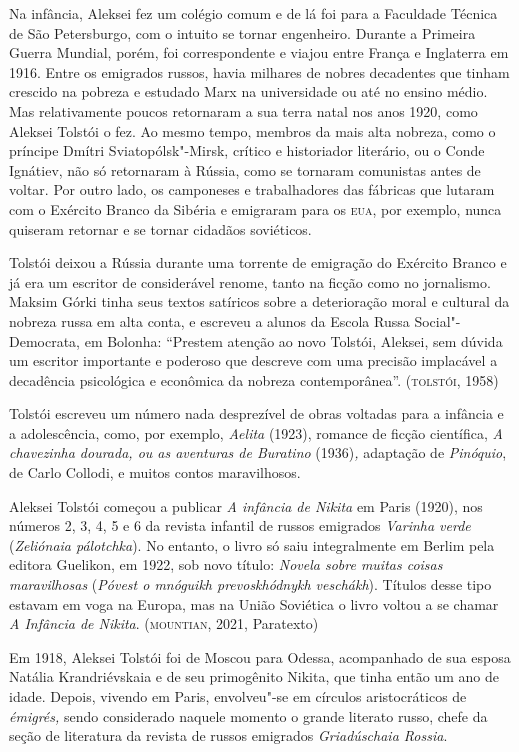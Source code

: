 \documentclass{article}
\begin{document}
Na infância, Aleksei fez um
colégio comum e de lá foi para a Faculdade Técnica de São Petersburgo,
com o intuito se tornar engenheiro. Durante a Primeira Guerra Mundial,
porém, foi correspondente e viajou entre França e Inglaterra em
1916. Entre os emigrados russos,
havia milhares de nobres decadentes que tinham crescido na pobreza e
estudado Marx na universidade ou até no ensino médio. Mas relativamente
poucos retornaram a sua terra natal nos anos 1920, como Aleksei Tolstói
o fez. Ao mesmo tempo, membros da mais alta nobreza, como o príncipe
Dmítri Sviatopólsk"-Mirsk, crítico e historiador literário, ou o Conde
Ignátiev, não só retornaram à Rússia, como se tornaram comunistas antes
de voltar. Por outro lado, os camponeses e trabalhadores das fábricas
que lutaram com o Exército Branco da Sibéria e emigraram para os \textsc{eua},
por exemplo, nunca quiseram retornar e se tornar cidadãos soviéticos.

Tolstói deixou a Rússia durante uma torrente de emigração do Exército
Branco e já era um escritor de considerável renome, tanto na ficção como
no jornalismo. Maksim Górki tinha seus textos satíricos sobre a
deterioração moral e cultural da nobreza russa em alta conta, e escreveu
a alunos da Escola Russa Social"-Democrata, em Bolonha: ``Prestem atenção
ao novo Tolstói, Aleksei, sem dúvida um escritor importante e poderoso
que descreve com uma precisão implacável a decadência psicológica e
econômica da nobreza contemporânea''. (\textsc{tolstói}, 1958)

Tolstói escreveu um número nada desprezível de obras voltadas para a
infância e a adolescência, como, por exemplo, \emph{Aelita} (1923),
romance de ficção científica, \emph{A chavezinha dourada, ou as
aventuras de Buratino} (1936)\emph{,} adaptação de \emph{Pinóquio}, de
Carlo Collodi, e muitos contos maravilhosos.

Aleksei Tolstói começou a publicar \emph{A infância de Nikita} em Paris
(1920), nos números 2, 3, 4, 5 e 6 da revista infantil de russos
emigrados \emph{Varinha verde} (\emph{Zeliónaia pálotchka}). No entanto,
o livro só saiu integralmente em Berlim pela editora Guelikon, em 1922,
sob novo título: \emph{Novela sobre muitas coisas maravilhosas}
(\emph{Póvest o mnóguikh prevoskhódnykh veschákh}). Títulos desse tipo
estavam em voga na Europa, mas na União Soviética o livro voltou a se
chamar \emph{A Infância de Nikita}. (\textsc{mountian}, 2021, Paratexto)

Em 1918, Aleksei Tolstói foi de Moscou para Odessa, acompanhado de sua
esposa Natália Krandriévskaia e de seu primogênito Nikita, que tinha
então um ano de idade. Depois, vivendo em Paris, envolveu"-se em círculos
aristocráticos de \emph{émigrés,} sendo considerado naquele momento o
grande literato russo, chefe da seção de literatura da revista de russos
emigrados \emph{Griadúschaia Rossia}.
\end{document}
